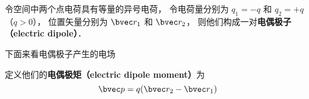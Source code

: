 


令空间中两个点电荷具有等量的异号电荷， 令电荷量分别为 $q_1 = -q$ 和 $q_2 = +q$ （$q > 0$）， 位置矢量分别为 $\bvec r_1$ 和 $\bvec r_2$， 则他们构成一对\textbf{电偶极子（electric dipole）}．

下面来看电偶极子产生的电场

定义他们的\textbf{电偶极矩（electric dipole moment）}为
\begin{equation}
\bvec p = q (\bvec r_2 - \bvec r_1)
\end{equation}
